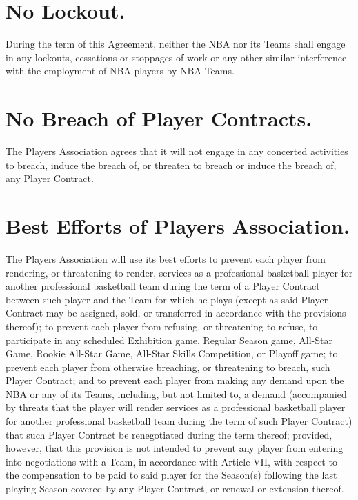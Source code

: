 \documentclass[
]{book}
\begin{document}
\hypertarget{no-lockout.}{%
\section{No Lockout.}\label{no-lockout.}}

During the term of this Agreement, neither the NBA nor its Teams shall engage in any lockouts, cessations or stoppages of work or any other similar interference with the employment of NBA players by NBA Teams.

\hypertarget{no-breach-of-player-contracts.}{%
\section{No Breach of Player Contracts.}\label{no-breach-of-player-contracts.}}

The Players Association agrees that it will not engage in any concerted activities to breach, induce the breach of, or threaten to breach or induce the breach of, any Player Contract.

\hypertarget{best-efforts-of-players-association.}{%
\section{Best Efforts of Players Association.}\label{best-efforts-of-players-association.}}

The Players Association will use its best efforts to prevent each player from rendering, or threatening to render, services as a professional basketball player for another professional basketball team during the term of a Player Contract between such player and the Team for which he plays (except as said Player Contract may be assigned, sold, or transferred in accordance with the provisions thereof); to prevent each player from refusing, or threatening to refuse, to participate in any scheduled Exhibition game, Regular Season game, All-Star Game, Rookie All-Star Game, All-Star Skills Competition, or Playoff game; to prevent each player from otherwise breaching, or threatening to breach, such Player Contract; and to prevent each player from making any demand upon the NBA or any of its Teams, including, but not limited to, a demand (accompanied by threats that the player will render services as a professional basketball player for another professional basketball team during the term of such Player Contract) that such Player Contract be renegotiated during the term thereof; provided, however, that this provision is not intended to prevent any player from entering into negotiations with a Team, in accordance with Article VII, with respect to the compensation to be paid to said player for the Season(s) following the last playing Season covered by any Player Contract, or renewal or extension thereof.
\end{document}
